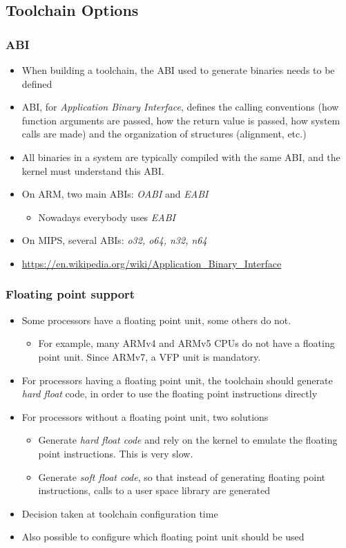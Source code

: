 \subsection{Toolchain Options}
\begin{frame}
  \frametitle{ABI}
  \begin{itemize}
  \item When building a toolchain, the ABI used to generate binaries
    needs to be defined
  \item ABI, for {\em Application Binary Interface}, defines the
    calling conventions (how function arguments are passed, how the
    return value is passed, how system calls are made) and the
    organization of structures (alignment, etc.)
  \item All binaries in a system are typically compiled with the same ABI,
    and the kernel must understand this ABI.
  \item On ARM, two main ABIs: {\em OABI} and {\em EABI}
    \begin{itemize}
    \item Nowadays everybody uses {\em EABI}
    \end{itemize}
  \item On MIPS, several ABIs: {\em o32, o64, n32, n64}
  \item {\fontsize{10}{15} \url{https://en.wikipedia.org/wiki/Application_Binary_Interface}}
  \end{itemize}
\end{frame}

\begin{frame}
  \frametitle{Floating point support}
  \begin{itemize}
  \item Some processors have a floating point unit, some others do not.
    \begin{itemize}
    \item For example, many ARMv4 and ARMv5 CPUs do not have a
      floating point unit.  Since ARMv7, a VFP unit is mandatory.
    \end{itemize}
  \item For processors having a floating point unit, the toolchain
    should generate {\em hard float} code, in order to use the
    floating point instructions directly
  \item For processors without a floating point unit, two solutions
    \begin{itemize}
    \item Generate {\em hard float code} and rely on the kernel to
      emulate the floating point instructions. This is very slow.
    \item Generate {\em soft float code}, so that instead of
      generating floating point instructions, calls to a user space
      library are generated
    \end{itemize}
  \item Decision taken at toolchain configuration time
  \item Also possible to configure which floating point unit should be used
  \end{itemize}
\end{frame}

